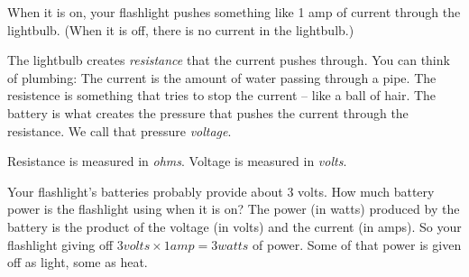 When it is on, your flashlight pushes something like 1 amp of current
through the lightbulb. (When it is off, there is no current in the
lightbulb.)

The lightbulb creates \textit{resistance} that the current pushes
through. You can think of plumbing: The current is the amount of water
passing through a pipe. The resistence is something that tries to stop
the current -- like a ball of hair.  The battery is what creates the
pressure that pushes the current through the resistance. We call that
pressure \textit{voltage}.

Resistance is measured in \textit{ohms}.  Voltage is measured in
\textit{volts}.

Your flashlight's batteries probably provide about 3 volts.  How much
battery power is the flashlight using when it is on? The power (in
watts) produced by the battery is the product of the voltage (in
volts) and the current (in amps). So your flashlight giving off $3
volts \times 1 amp = 3 watts$ of power. Some of that power is given
off as light, some as heat.






